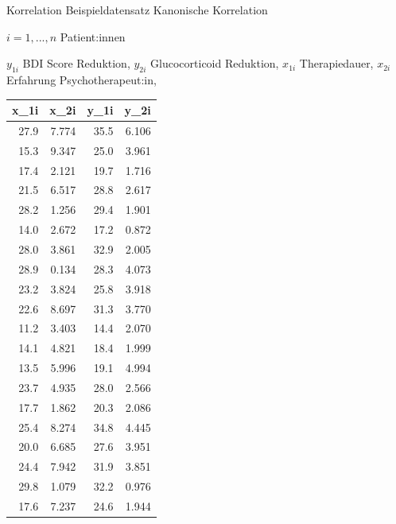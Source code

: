 \documentclass[
  8pt,
  ignorenonframetext,
]{beamer}
\begin{document}
\begin{frame}{Korrelation}
\protect\hypertarget{korrelation-12}{}
Beispieldatensatz Kanonische Korrelation

\footnotesize

\(i = 1,...,n\) Patient:innen

\center

\(y_{1i}\) BDI Score Reduktion, \(y_{2i}\) Glucocorticoid Reduktion,
\(x_{1i}\) Therapiedauer, \(x_{2i}\) Erfahrung Psychotherapeut:in,


\begin{longtable}[]{@{}rrrr@{}}
\toprule()
x\_1i & x\_2i & y\_1i & y\_2i \\
\midrule()
\endhead
27.9 & 7.774 & 35.5 & 6.106 \\
15.3 & 9.347 & 25.0 & 3.961 \\
17.4 & 2.121 & 19.7 & 1.716 \\
21.5 & 6.517 & 28.8 & 2.617 \\
28.2 & 1.256 & 29.4 & 1.901 \\
14.0 & 2.672 & 17.2 & 0.872 \\
28.0 & 3.861 & 32.9 & 2.005 \\
28.9 & 0.134 & 28.3 & 4.073 \\
23.2 & 3.824 & 25.8 & 3.918 \\
22.6 & 8.697 & 31.3 & 3.770 \\
11.2 & 3.403 & 14.4 & 2.070 \\
14.1 & 4.821 & 18.4 & 1.999 \\
13.5 & 5.996 & 19.1 & 4.994 \\
23.7 & 4.935 & 28.0 & 2.566 \\
17.7 & 1.862 & 20.3 & 2.086 \\
25.4 & 8.274 & 34.8 & 4.445 \\
20.0 & 6.685 & 27.6 & 3.951 \\
24.4 & 7.942 & 31.9 & 3.851 \\
29.8 & 1.079 & 32.2 & 0.976 \\
17.6 & 7.237 & 24.6 & 1.944 \\
\bottomrule()
\end{longtable}
\end{frame}
\end{document}
